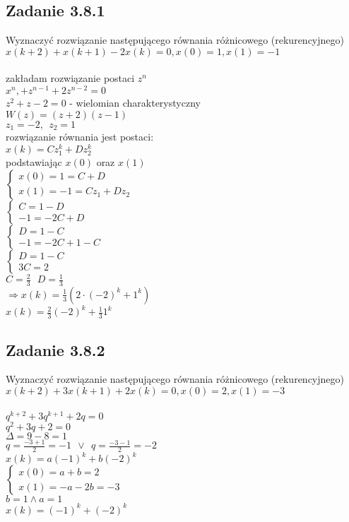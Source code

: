\subsection*{Zadanie 3.8.1} {\color{darkgray}
	Wyznaczyć rozwiązanie następującego równania różnicowego (rekurencyjnego)\\
	$x(k+2)+x(k+1)-2x(k)=0, x(0)=1,x(1)=-1$
}\\\\
zakładam rozwiązanie postaci $z^n$\\
$x^n, +z^{n-1}+2z^{n-2}=0$\\
$z^2+z-2=0$ - wielomian charakterystyczny\\
$W(z)=(z+2)(z-1)$\\
$z_1=-2, \ \ z_2=1$\\
rozwiązanie równania jest postaci:\\
$x(k)=Cz_1^k+Dz_2^k$\\
podstawiając $x(0)$ oraz $x(1)$\\
$\begin{cases} 
	x(0)=1=C+D \\
	x(1)=-1=Cz_1+Dz_2
\end{cases}$\\
$\begin{cases}
	 C=1-D \\
	-1=-2C+D
\end{cases}$\\
$\begin{cases}
	 D=1-C\\
	-1=-2C+1-C
\end{cases}$\\
$\begin{cases}
	 D=1-C\\
	3C=2
\end{cases}$\\
$C=\frac{2}{3} \ \ \ D=\frac{1}{3}$\\
$\Rightarrow x(k)=\frac{1}{3}(2 \cdot(-2)^k+1^k)$\\
$\boxed{x(k)=\frac{2}{3}(-2)^k+\frac{1}{3}1^k}$

\pagebreak
\subsection*{Zadanie 3.8.2} {\color{darkgray}
	Wyznaczyć rozwiązanie następującego równania różnicowego (rekurencyjnego)\\
	$x(k+2)+3x(k+1)+2x(k)=0, x(0)=2,x(1)=-3$
}\\\\
$q^{k+2}+3q^{k+1}+2q=0$\\
$q^2+3q+2=0$\\
$\Delta=9-8=1$\\
$q=\frac{-3+1}{2}=-1 \ \ \vee \ \ q=\frac{-3-1}{2}=-2$\\
$x(k)=a(-1)^k+b(-2)^k$\\
$\begin{cases} x(0)=a+b=2 \\ x(1)=-a-2b=-3\end{cases}$\\
$b=1 \wedge a=1$\\
$\boxed{x(k)=(-1)^k+(-2)^k}$

